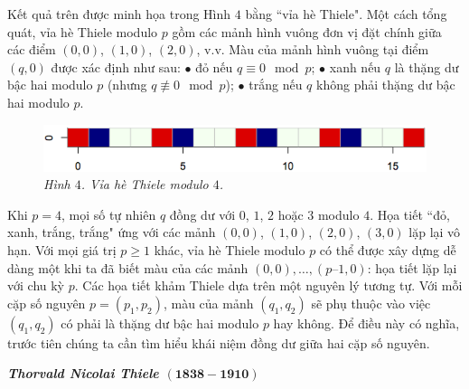 \begin{multicols}{2}
	Kết quả trên được minh họa trong Hình $4$ bằng ``vỉa hè Thiele". Một cách tổng quát, vỉa hè Thiele modulo $p$ gồm các mảnh hình vuông đơn vị đặt chính giữa các điểm $(0, 0)$, $(1, 0)$, $(2, 0)$, v.v. Màu của mảnh hình vuông tại điểm $(q, 0)$ được xác định như sau:
	\vskip 0.1cm
	$\bullet$	đỏ nếu $q \equiv 0 \mod{p}$;
	\vskip 0.1cm
	$\bullet$	xanh nếu $q$ là thặng dư bậc hai modulo $p$ (nhưng $q \not\equiv 0 \mod{p}$);
	\vskip 0.1cm
	$\bullet$	trắng nếu $q$ không phải thặng dư bậc hai modulo $p$.
	\begin{figure}[H]
		\vspace*{-5pt}
		\centering
		\captionsetup{labelformat= empty, justification=centering}
		\includegraphics[width= 1\linewidth]{mosaique-4.png}
		\caption{\small\textit{\color{toanhocdoisong}Hình $4$. Vỉa hè Thiele modulo $4$.}}
		\vspace*{-10pt}
	\end{figure}
	Khi $p = 4$, mọi số tự nhiên $q$ đồng dư với $0$, $1$, $2$ hoặc $3$ modulo $4$. Họa tiết ``đỏ, xanh, trắng, trắng" ứng với các mảnh $(0, 0)$, $(1, 0)$, $(2, 0)$, $(3, 0)$ lặp lại vô hạn. Với mọi giá trị $p \ge 1$ khác, vỉa hè Thiele modulo $p$ có thể được xây dựng dễ dàng một khi ta đã biết màu của các mảnh $(0, 0), \dots, (p – 1, 0)$: họa tiết lặp lại với chu kỳ $p$.
	\vskip 0.2cm
	Các họa tiết khảm Thiele dựa trên một nguyên lý tương tự. Với mỗi cặp số nguyên $p = (p_1, p_2)$, màu của mảnh $(q_1, q_2)$ sẽ phụ thuộc vào việc $(q_1, q_2)$ có phải là thặng dư bậc hai modulo $p$ hay không. Để điều này có nghĩa, trước tiên chúng ta cần tìm hiểu khái niệm đồng dư giữa hai cặp số nguyên.
	\begin{tBox}
		\textbf{\textit{\color{toanhocdoisong}Thorvald Nicolai Thiele $\pmb{(1838 \!-\! 1910)}$}}
		\vskip 0.2cm
		\begin{figure}
			\vspace*{-14pt}
			\centering
			\captionsetup{labelformat= empty, justification=centering}

\end{figure}
\end{tBox}
\end{multicols}
